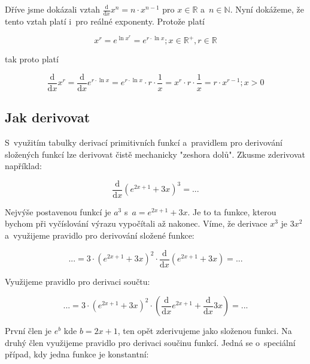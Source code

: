 Dříve jsme dokázali vztah \(\frac{\mathrm{d}}{\mathrm{d}x} x^n = n \cdot x^{n-1}\) pro \(x \in \mathbb{R}\) a~\(n \in \mathbb{N}\). Nyní dokážeme, že tento vztah platí i~pro reálné exponenty. Protože platí

\begin{equation}
x^r = e^{\ln x^r} = e^{r \cdot \ln x}; x \in \mathbb{R}^+, r \in \mathbb{R}
\end{equation}

tak proto platí

\begin{equation}
\frac{\mathrm{d}}{\mathrm{d}x} x^r = \frac{\mathrm{d}}{\mathrm{d}x} e^{r \cdot \ln x} = e^{r \cdot \ln x} \cdot r \cdot \frac{1}{x} = x^r \cdot r \cdot \frac{1}{x} = r \cdot x^{r-1}; x > 0
\end{equation}


\subsection{Jak derivovat}

S~využitím tabulky derivací primitivních funkcí a~pravidlem pro derivování složených funkcí lze derivovat čistě mechanicky "zeshora dolů". Zkusme zderivovat například:

\begin{equation}
\frac{\mathrm{d}}{\mathrm{d}x} \left(e^{2x+1} + 3x \right)^3 = ...
\end{equation}

Nejvýše postavenou funkcí je \(a^3\) s~\(a = e^{2x+1} + 3x\). Je to ta funkce, kterou bychom při vyčíslování výrazu vypočítali až nakonec. Víme, že derivace \(x^3\) je \(3 x^2\) a~využijeme pravidlo pro derivování složené funkce:

\begin{equation}
... = 3 \cdot \left(e^{2x+1} + 3x \right)^2 \cdot \frac{\mathrm{d}}{\mathrm{d}x} \left(e^{2x+1} + 3x \right) = ...
\end{equation}

Využijeme pravidlo pro derivaci součtu:

\begin{equation}
... = 3 \cdot \left(e^{2x+1} + 3x \right)^2 \cdot \left(\frac{\mathrm{d}}{\mathrm{d}x} e^{2x+1} + \frac{\mathrm{d}}{\mathrm{d}x} 3x \right) = ...
\end{equation}

První člen je \(e^b\) kde \(b = 2x + 1\), ten opět zderivujeme jako složenou funkci. Na druhý člen využijeme pravidlo pro derivaci součinu funkcí. Jedná se o~speciální případ, kdy jedna funkce je konstantní:

